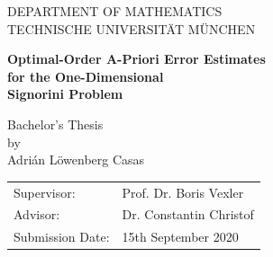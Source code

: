 \documentclass[headsepline,footsepline,footinclude=false,oneside,fontsize=11pt,paper=a4,listof=totoc,bibliography=totoc]{scrbook} %
\begin{document}
\pagestyle{empty}       %
  \parbox{1.5cm}{}\hspace{310pt}%
  \parbox{1.5cm}{}%
\vspace*{1.5cm}
\begin{center}
{\huge \MakeUppercase{Department of Mathematics}} 
\\
\vspace*{5mm}
{\large \MakeUppercase{Technische Universität München} }
\\
\vspace*{2cm}
{\huge {\textbf{{Optimal-Order A-Priori Error Estimates} \\ for the
One-Dimensional\\ Signorini Problem}\par}}
\vspace*{2cm}
{\Large Bachelor's Thesis}\linebreak \\ 
{\Large by}\linebreak \\
{\Large Adrián Löwenberg Casas}\\
\vspace*{1.8cm}
{\large 
\begin{tabular}{ll}
Supervisor: & Prof. Dr. Boris Vexler\\
Advisor: & Dr. Constantin Christof\\
Submission Date: & 15th September 2020
\end{tabular}
}
\end{center}
\newpage    %
\end{document}
